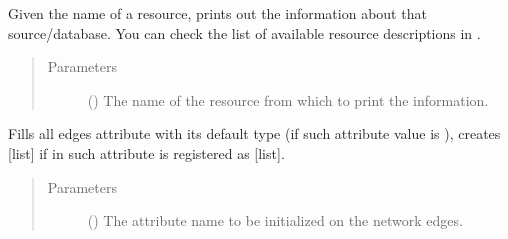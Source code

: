 \documentclass[letterpaper,10pt,english]{sphinxmanual}
\begin{document}
\begin{fulllineitems}

\begin{fulllineitems}
\label{\detokenize{main:pypath.main.PyPath.in_undirected}}
\end{fulllineitems}


\begin{fulllineitems}
\label{\detokenize{main:pypath.main.PyPath.info}}
Given the name of a resource, prints out the information about
that source/database. You can check the list of available
resource descriptions in
.
\begin{quote}\begin{description}
\item[{Parameters}] \leavevmode
{} () \textendash{} The name of the resource from which to print the
information.

\end{description}\end{quote}

\end{fulllineitems}


\begin{fulllineitems}
\label{\detokenize{main:pypath.main.PyPath.init_complex_attr}}
\end{fulllineitems}


\begin{fulllineitems}
\label{\detokenize{main:pypath.main.PyPath.init_edge_attr}}
Fills all edges attribute  with its default type (if
such attribute value is ), creates {[}list{]} if in
 such attribute is
registered as {[}list{]}.
\begin{quote}\begin{description}
\item[{Parameters}] \leavevmode
{} () \textendash{} The attribute name to be initialized on the network edges.


\end{description}
\end{quote}
\end{fulllineitems}
\end{fulllineitems}
\end{document}
